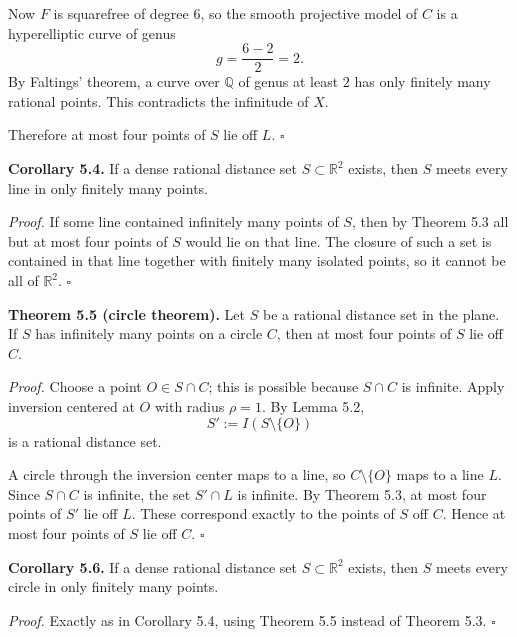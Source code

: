 Now $F$ is squarefree of degree $6$, so the smooth projective model of $C$ is a hyperelliptic curve of genus
\[
g=\frac{6-2}{2}=2.
\]
By Faltings' theorem, a curve over $\mathbb{Q}$ of genus at least $2$ has only finitely many rational points. This contradicts the infinitude of $X$.

Therefore at most four points of $S$ lie off $L$.
\hfill$\square$

\medskip
\noindent\textbf{Corollary 5.4.}
If a dense rational distance set $S\subset \mathbb{R}^2$ exists, then $S$ meets every line in only finitely many points.

\smallskip
\noindent\emph{Proof.}
If some line contained infinitely many points of $S$, then by Theorem 5.3 all but at most four points of $S$ would lie on that line. The closure of such a set is contained in that line together with finitely many isolated points, so it cannot be all of $\mathbb{R}^2$.
\hfill$\square$

\medskip
\noindent\textbf{Theorem 5.5 (circle theorem).}
Let $S$ be a rational distance set in the plane. If $S$ has infinitely many points on a circle $C$, then at most four points of $S$ lie off $C$.

\smallskip
\noindent\emph{Proof.}
Choose a point $O\in S\cap C$; this is possible because $S\cap C$ is infinite. Apply inversion centered at $O$ with radius $\rho=1$. By Lemma 5.2,
\[
S':=I(S\setminus\{O\})
\]
is a rational distance set.

A circle through the inversion center maps to a line, so $C\setminus\{O\}$ maps to a line $L$. Since $S\cap C$ is infinite, the set $S'\cap L$ is infinite. By Theorem 5.3, at most four points of $S'$ lie off $L$. These correspond exactly to the points of $S$ off $C$. Hence at most four points of $S$ lie off $C$.
\hfill$\square$

\medskip
\noindent\textbf{Corollary 5.6.}
If a dense rational distance set $S\subset \mathbb{R}^2$ exists, then $S$ meets every circle in only finitely many points.

\smallskip
\noindent\emph{Proof.}
Exactly as in Corollary 5.4, using Theorem 5.5 instead of Theorem 5.3.
\hfill$\square$

